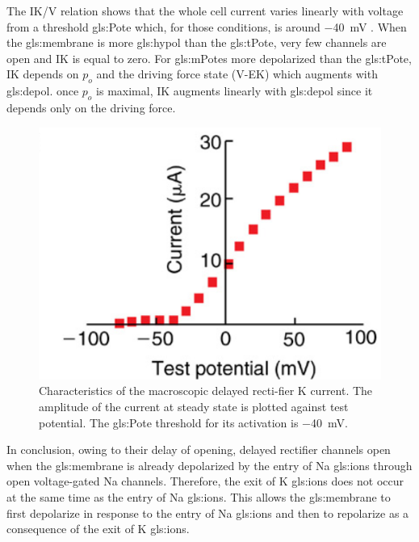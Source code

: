 \documentclass[class={myRUCProject}, crop=false]{standalone}
\begin{document}
The IK/V relation shows that the whole cell current varies linearly with voltage from a threshold \gls{gls:Pote} which, for those conditions, is around \qty{-40}{\mV} . When the \gls{gls:membrane} is more \gls{gls:hypol} than the \gls{gls:tPote}, very few channels are open and IK is equal to zero. For \glspl{gls:mPote} more depolarized than the \gls{gls:tPote}, IK depends on \(p_o\) and the driving force state (V-EK) which augments with \gls{gls:depol}. once \(p_o\) is maximal, IK augments linearly with \gls{gls:depol} since it depends only on the driving force. 
\begin{figure}[H]
  \centering
  \includegraphics[width=0.5\linewidth]{Pictures//Anakin/IK-V.png}
  \caption{Characteristics of the macroscopic delayed recti-fier \gls{K} current. The amplitude of the current at steady state is plotted against test potential. The \gls{gls:Pote} threshold for its activation is \qty{-40}{\mV}. }
  \label{fig:Kcurrent}
\end{figure}
In conclusion, owing to their delay of opening, delayed rectifier channels open when the \gls{gls:membrane} is already depolarized by the entry of \gls{Na} \glspl{gls:ion} through open voltage-gated \gls{Na} channels. Therefore, the exit of \gls{K} \glspl{gls:ion} does not occur at the same time as the entry of \gls{Na} \glspl{gls:ion}. This allows the \gls{gls:membrane} to first depolarize in response to the entry of \gls{Na} \glspl{gls:ion} and then to repolarize as a consequence of the exit of \gls{K} \glspl{gls:ion}.
\end{document}
